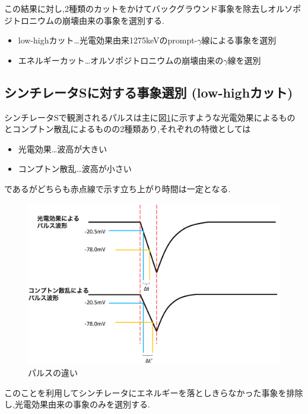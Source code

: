 この結果に対し,2種類のカットをかけてバックグラウンド事象を除去しオルソポジトロニウムの崩壊由来の事象を選別する.
\begin{itemize}
	\item low-highカット…光電効果由来1275keVのprompt-$\gamma$線による事象を選別
	\item エネルギーカット…オルソポジトロニウムの崩壊由来の$\gamma$線を選別
\end{itemize}

\subsection{シンチレータSに対する事象選別 (low-highカット)}
シンチレータSで観測されるパルスは主に図\ref{fig:pulse_diff}に示すような光電効果によるものとコンプトン散乱によるものの2種類あり,それぞれの特徴としては
\begin{itemize}
	\item 光電効果…波高が大きい
	\item コンプトン散乱…波高が小さい
\end{itemize}
であるがどちらも赤点線で示す立ち上がり時間は一定となる.
\begin{figure}[H]
	\begin{center}
		\includegraphics[width=15cm]{fig/isb/pulse_difference.pdf}
		\caption{パルスの違い}
		\label{fig:pulse_diff}
	\end{center}
\end{figure}
このことを利用してシンチレータにエネルギーを落としきらなかった事象を排除し,光電効果由来の事象のみを選別する.

